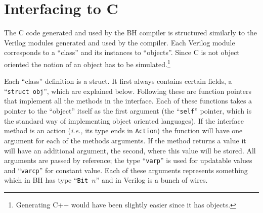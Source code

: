 \documentclass[twoside,letterpaper]{article}
\newcommand{\ie}{\emph{i.e.,}}
\newcommand{\BH}{BH}
\newcommand{\veri}{Verilog}
\newcommand{\te}[1]{\texttt{#1}}
\newcommand{\qbs}[1]{``\mbox{\te{#1}}''}
\begin{document}

\section{Interfacing to C}

The C code generated and used by the {\BH} compiler is structured
similarly to the {\veri} modules generated and used by the compiler.
Each {\veri} module corresponds to a ``class'' and its instances to
``objects''.  Since C is not object oriented the notion of an object
has to be simulated.{\footnote{Generating C++ would have been slightly
easier since it has objects.}}

Each ``class'' definition is a struct.  It first always contains
certain fields, a \qbs{struct obj}, which are explained below.
Following these are function pointers that implement all the methods
in the interface.  Each of these functions takes a pointer to the
``object'' itself as the first argument (the \qbs{self} pointer, which
is the standard way of implementing object oriented languages).  If
the interface method is an action ({\ie} its type ends in \te{Action})
the function will have one argument for each of the methods arguments.
If the method returns a value it will have an additional argument, the
second, where this value will be stored.  All arguments are passed by
reference; the type \qbs{varp} is used for updatable values and
{\qbs{varcp}} for constant value.  Each of these arguments represents
something which in {\BH} has type \qbs{Bit $n$} and in {\veri} is a
bunch of wires.
\end{document}

